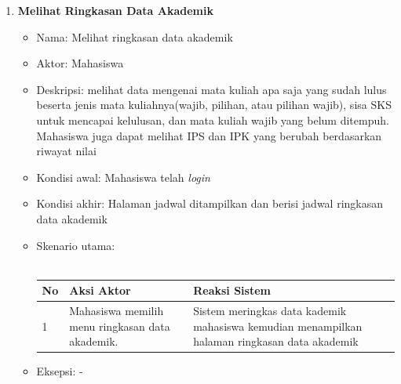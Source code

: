 \documentclass[a4paper,twoside]{article}
\begin{document}
\begin{enumerate}
\begin{enumerate}
\begin{enumerate}
	\item \textbf{Melihat Ringkasan Data Akademik}
		\begin{itemize}
			\item Nama: Melihat ringkasan data akademik
			\item Aktor: Mahasiswa
			\item Deskripsi: melihat data mengenai mata kuliah apa saja yang sudah lulus beserta jenis mata kuliahnya(wajib, pilihan, atau pilihan wajib), sisa SKS untuk mencapai kelulusan, dan mata kuliah wajib yang belum ditempuh. Mahasiswa juga dapat melihat IPS dan IPK yang berubah berdasarkan riwayat nilai
			\item Kondisi awal: Mahasiswa telah \textit{login}
			\item Kondisi akhir: Halaman jadwal ditampilkan dan berisi jadwal ringkasan data akademik
			\item Skenario utama: \\ \\
			\begin{tabular}{|p{0.5cm} |p{6cm}| p{6cm}|}
						\hline
							No 	& Aksi Aktor & Reaksi Sistem \\ \hline
							1 	& Mahasiswa memilih menu ringkasan data akademik. 	&	Sistem meringkas data kademik mahasiswa kemudian menampilkan halaman ringkasan data akademik \\ \hline 
						\end{tabular} 
			\item Eksepsi: -
		\end{itemize}
\end{enumerate}


\end{enumerate}
\end{enumerate}
\end{document}
